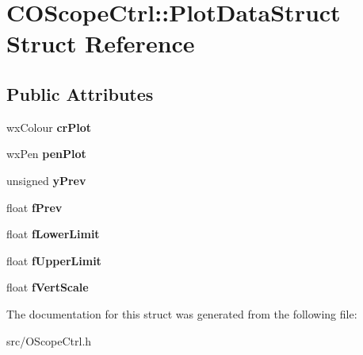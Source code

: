 \section{COScopeCtrl::PlotDataStruct Struct Reference}
\label{structCOScopeCtrl_1_1PlotDataStruct}
\subsection*{Public Attributes}
\begin{DoxyCompactItemize}
\item 
wxColour {\bfseries crPlot}\label{structCOScopeCtrl_1_1PlotDataStruct_a78caf2ee9ea3719e403b6fb49300b950}

\item 
wxPen {\bfseries penPlot}\label{structCOScopeCtrl_1_1PlotDataStruct_a72ccb93c64e27d95b14a836bbfbf7465}

\item 
unsigned {\bfseries yPrev}\label{structCOScopeCtrl_1_1PlotDataStruct_a075a951e8db3d39f25fd98cd75093058}

\item 
float {\bfseries fPrev}\label{structCOScopeCtrl_1_1PlotDataStruct_a178090e97bea77ef9a847ec6eef68775}

\item 
float {\bfseries fLowerLimit}\label{structCOScopeCtrl_1_1PlotDataStruct_a00e76b33209fb95a49178a5336e2d5d4}

\item 
float {\bfseries fUpperLimit}\label{structCOScopeCtrl_1_1PlotDataStruct_a36b5bd3d465e99ff64c58755e0a19134}

\item 
float {\bfseries fVertScale}\label{structCOScopeCtrl_1_1PlotDataStruct_a10f630240fe6c44c98b13bf83e9b5521}

\end{DoxyCompactItemize}


The documentation for this struct was generated from the following file:\begin{DoxyCompactItemize}
\item 
src/OScopeCtrl.h\end{DoxyCompactItemize}
